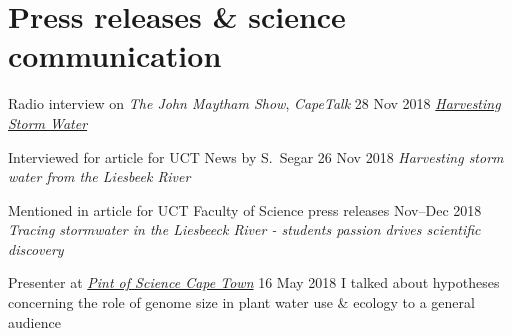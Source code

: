\documentclass[10pt]{article}
\begin{document}
\section*{Press releases \& science communication} %

\begin{hangparas}{2em}{1}

Radio interview on \textit{The John Maytham Show}, \textit{CapeTalk}
                                                       \hfill 28 Nov 2018 \break
\href{https://www.capetalk.co.za/articles/328900/harvesting-stormwater-from-liesbeek-river-may-aid-ct-water-supply-students-find}
{\textit{Harvesting Storm Water}}

Interviewed for article for UCT News by S.~Segar       \hfill 26 Nov 2018 \break
\textit{Harvesting storm water from the Liesbeek River}

Mentioned in article for UCT Faculty of Science press releases
                                                     \hfill Nov--Dec 2018 \break
\textit{Tracing stormwater in the Liesbeeck River - students passion drives
scientific discovery}


Presenter at \href{http://pintofsciencesa.wixsite.com/pintofsciencesa/uct-planet-earth-16}
{\textit{Pint of Science Cape Town}}                   \hfill 16 May 2018 \break
I talked about hypotheses concerning the role of genome size in plant water use 
\& ecology                                                                \break
to a general audience

\hfill

\end{hangparas}
\end{document}

